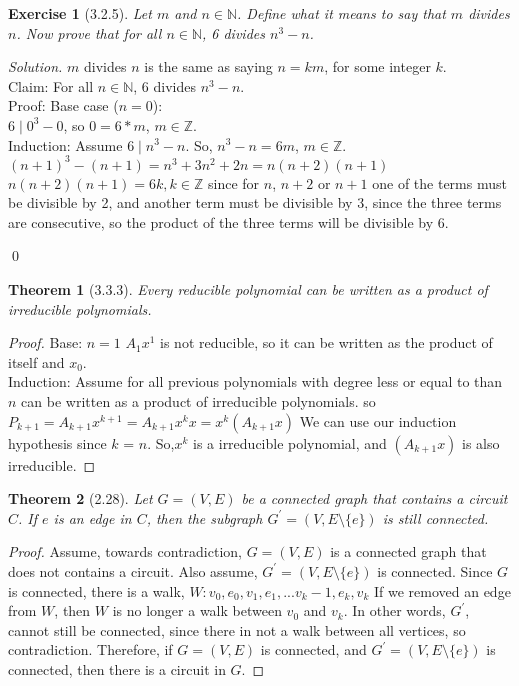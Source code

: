 \documentclass{article}
\newtheorem*{thm}{Theorem}
\newtheorem*{ex}{Exercise}
\newenvironment{solution}
  {\begin{proof}[Solution]}
  {\renewcommand{\qedsymbol}{}\end{proof}}
\begin{document}
\begin{ex}[3.2.5]
	Let $m$ and $n \in \mathbb{N}$. Define what it means to say that $m$ divides $n$. Now prove that for all $n \in \mathbb{N}$, 6 divides
	$n^3-n$.
\end{ex}
\begin{solution}
	$m$ divides $n$ is the same as saying $n=km$, for some integer $k$.\\ 
	Claim: For all $n \in \mathbb{N}$, 6 divides $n^3-n$. \\
	Proof: Base case ($n = 0$):\\
		$6 \mid 0^3 - 0$, so $0 = 6 * m$, $m \in \mathbb{Z}$.\\
		Induction: Assume $6 \mid n^3 - n$. So, $n^3-n = 6m$, $m \in \mathbb{Z}$.
		$(n+1)^3 - (n+1) = n^3 + 3n^2 + 2n = n(n+2)(n+1)$ 
		$n(n+2)(n+1) = 6k, k\in \mathbb{Z}$ since for  $n$, $n+2$ or $n+1$ one of the terms must be divisible by 2, and another term must be divisible by 3, since the three terms are consecutive, so the product of the
		three terms will be divisible by 6.
		 
\qed

\end{solution}

\begin{thm}[3.3.3]
	Every reducible polynomial can be written as a product of irreducible polynomials.
\end{thm}
\begin{proof}
	Base: $n=1$ $A_1 x^1$ is not reducible, so it can be written as the product of itself and $x_0$.
	\\
	Induction: Assume for all previous polynomials with degree less or equal to than $n$ can be written as a product of irreducible polynomials.
	so $P_{k+1}= A_{k+1}x^{k+1} =  A_{k+1}x^{k}x = x^k(A_{k+1}x)$ We can use our induction hypothesis since $k$ = $n$. So,$x^k$ is a irreducible polynomial, and $(A_{k+1}x)$ is also irreducible. 
\end{proof}

\begin{thm}[2.28]
	Let $G= (V,E)$ be a connected graph that contains a circuit $C$. If $e$ is an edge
in $C$, then the subgraph $G^\prime= (V,E \setminus \{e\})$ is still connected.
\end{thm}
\begin{proof}
  Assume, towards contradiction, $G= (V,E)$ is a connected graph that does not contains a circuit. Also assume, $G^\prime= (V,E \setminus \{e\})$ is connected. 
  Since $G$ is connected, there is a walk, $W: v_0, e_0, v_1, e_1, ... v_k-1, e_k, v_k$ 
  If we removed an edge from $W$, then $W$ is no longer a walk between $v_0$ and $v_k$. In other words,  $G^\prime$, cannot still be connected, since there in not a walk between all vertices, so contradiction.
  Therefore, if $G= (V,E)$ is connected, and $G^\prime= (V,E \setminus \{e\})$ is connected, then there is a circuit in $G$.
\end{proof}
\end{document}
